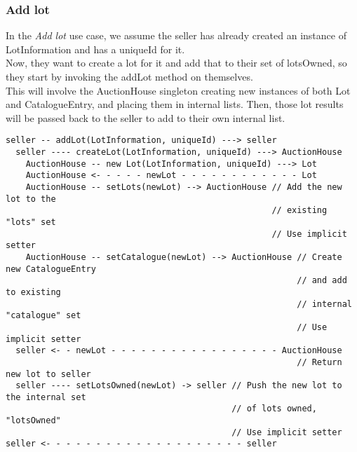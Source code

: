 \documentclass[titlepage, 12pt]{extarticle}
\begin{document}
\subsubsection{Add lot}
In the {\it Add lot} use case, we assume the seller has already created an instance of LotInformation and has a uniqueId for it.\\
Now, they want to create a lot for it and add that to their set of lotsOwned, so they start by invoking the addLot method on themselves.\\
This will involve the AuctionHouse singleton creating new instances of both Lot and CatalogueEntry, and placing them in internal lists. Then, those lot results will be passed back to the seller to add to their own internal list.\newpage
\begin{verbatim}
seller -- addLot(LotInformation, uniqueId) ---> seller
  seller ---- createLot(LotInformation, uniqueId) ---> AuctionHouse
    AuctionHouse -- new Lot(LotInformation, uniqueId) ---> Lot
    AuctionHouse <- - - - - newLot - - - - - - - - - - - - Lot
    AuctionHouse -- setLots(newLot) --> AuctionHouse // Add the new lot to the
                                                     // existing "lots" set
                                                     // Use implicit setter
    AuctionHouse -- setCatalogue(newLot) --> AuctionHouse // Create new CatalogueEntry
                                                          // and add to existing
                                                          // internal "catalogue" set
                                                          // Use implicit setter
  seller <- - newLot - - - - - - - - - - - - - - - - - AuctionHouse
                                                          // Return new lot to seller
  seller ---- setLotsOwned(newLot) -> seller // Push the new lot to the internal set
                                             // of lots owned, "lotsOwned"
                                             // Use implicit setter
seller <- - - - - - - - - - - - - - - - - - - - seller
\end{verbatim}
\end{document}
